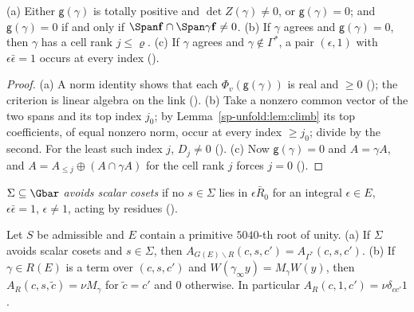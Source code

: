 \begin{proposition}
\label{sp-unfold:prop:cells}
(a) Either $\mathsf g(\gamma)$ is totally positive and $\det Z(\gamma)\ne0$, or $\mathsf g(\gamma)=0$;
and $\mathsf g(\gamma)=0$ if and only if $\Span\mathbf f\cap\Span\gamma\mathbf f\ne0$. (b) If
$\gamma$ agrees and $\mathsf g(\gamma)=0$, then $\gamma$ has a cell rank $j\le\varrho$. (c) If
$\gamma$ agrees and $\gamma\notin\Gamma^*$, a pair $(\epsilon,1)$ with $\epsilon\bar\epsilon=1$ occurs at
every index ().
\end{proposition}

\begin{proof}
(a) A norm identity shows that each $\Phi_v(\mathsf g(\gamma))$ is real and $\ge0$
(); the criterion is linear algebra on the link
(). (b) Take a nonzero common vector of the two spans and its
top index $j_0$; by Lemma~\ref{sp-unfold:lem:climb} its top coefficients, of equal nonzero norm,
occur at every index $\ge j_0$; divide by the second. For the least such index $j$, $D_j\ne0$
(). (c) Now $\mathsf g(\gamma)=0$ and
$A=\gamma A$, and $A=A_{\le j}\oplus(A\cap\gamma A)$ for the cell rank $j$ forces $j=0$
().
\end{proof}

$\Sigma\subseteq\Gbar$ \emph{avoids scalar cosets} if no $s\in\Sigma$ lies in $\epsilon\bar R_0$ for an
integral $\epsilon\in E$, $\epsilon\bar\epsilon=1$, $\epsilon\ne1$, acting by residues
().

\begin{proposition}\label{sp-unfold:prop:sort}
Let $S$ be admissible and $E$ contain a primitive $5040$-th root of unity. (a) If $\Sigma$ avoids
scalar cosets and $s\in\Sigma$, then $A_{G(E)\smallsetminus R}(c,s,c')=A_{\Gamma^*}(c,s,c')$. (b) If
$\gamma\in R(E)$ is a term over $(c,s,c')$ and $W(\gamma_\infty y)=M_\gamma W(y)$, then
$A_R(c,s,\tilde c)=\nu M_\gamma$ for $\tilde c=c'$ and $0$ otherwise. In particular $A_R(c,1,c')=\nu\delta_{cc'}1$.
\end{proposition}

